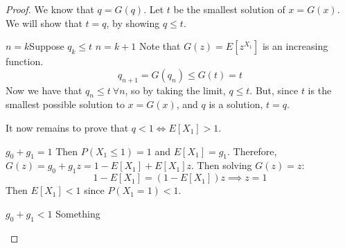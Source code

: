 \documentclass[../Main.tex]{subfiles}
\begin{document}
\begin{proof}
    We know that $q = G(q)$. Let $t$ be the smallest solution of $x = G(x)$. We will show that $t = q$, by showing $q \leq t$.\par
    {$n = k$}{Suppose $q_k \leq t$}
    {$n = k + 1$}{
        Note that $G(z) = E[z^{X_1}]$ is an increasing function.
        \begin{equation*}
            q_{n + 1} = G(q_n) \leq G(t) = t
        \end{equation*}
    }
    Now we have that $q_n \leq t~\forall n$, so by taking the limit, $q \leq t$. But, since $t$ is the smallest possible solution to $x = G(x)$, and $q$ is a solution, $t = q$.\par
    It now remains to prove that $q < 1 \Leftrightarrow E[X_1] > 1$.
    \begin{case}{$g_0 + g_1 = 1$}
        Then $P(X_1 \leq 1) = 1$ and $E[X_1] = g_1$. Therefore, $G(z) = g_0 + g_1 z = 1 - E[X_1] + E[X_1] z$. Then solving $G(z) = z$:
        \begin{equation*}
            1 - E[X_1] = \left(1 - E[X_1]\right)z \implies z = 1
        \end{equation*}
        Then $E[X_1] < 1$ since $P(X_1 = 1) < 1$.
    \end{case}
    \begin{case}{$g_0 + g_1 < 1$}
        Something
    \end{case}
\end{proof}
\end{document}
